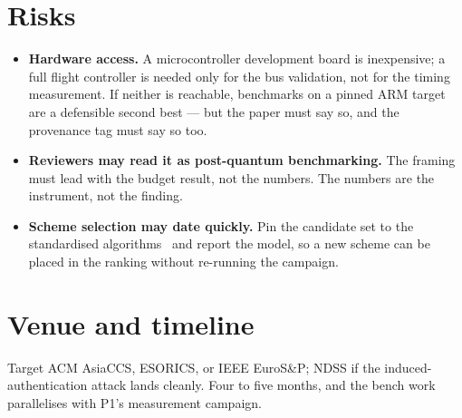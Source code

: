 \documentclass[11pt,a4paper]{article}
\begin{document}
\section{Risks}
\begin{itemize}
\item \textbf{Hardware access.} A microcontroller development board is
inexpensive; a full flight controller is needed only for the bus validation, not
for the timing measurement. If neither is reachable, benchmarks on a pinned ARM
target are a defensible second best --- but the paper must say so, and the
provenance tag must say so too.
\item \textbf{Reviewers may read it as post-quantum benchmarking.} The framing
must lead with the budget result, not the numbers. The numbers are the
instrument, not the finding.
\item \textbf{Scheme selection may date quickly.} Pin the candidate set to the
standardised algorithms~\cite{nist_pqc} and report the model, so a new scheme
can be placed in the ranking without re-running the campaign.
\end{itemize}

\section{Venue and timeline}
Target ACM AsiaCCS, ESORICS, or IEEE EuroS\&P; NDSS if the induced-authentication
attack lands cleanly. Four to five months, and the bench work parallelises with
P1's measurement campaign.

\small


\end{document}

